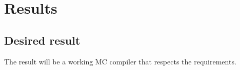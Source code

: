 \section{Results}
\subsection{Desired result}

The result will be a working MC compiler that respects the requirements.
